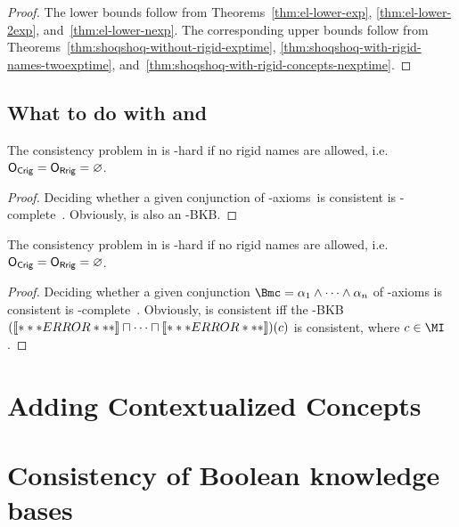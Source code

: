 \begin{proof}
  The lower bounds follow from Theorems~\ref{thm:el-lower-exp}, \ref{thm:el-lower-2exp},
  and~\ref{thm:el-lower-nexp}.  The corresponding upper bounds follow from
  Theorems~\ref{thm:shoqshoq-without-rigid-exptime}, \ref{thm:shoqshoq-with-rigid-names-twoexptime},
  and~\ref{thm:shoqshoq-with-rigid-concepts-nexptime}.
\end{proof}

\subsection{What to do with \texorpdfstring{\SHOIQEL}{SHOIQ[EL]} and \texorpdfstring{\ELSHOIQ}{EL[SHOIQ]}}
\label{sec:shoiq-el-and-el-shoiq}

\begin{theorem}\label{thm:shoiqel-lower-no-rigid}
  The consistency problem in \SHOIQEL is \NExpTime-hard if no rigid names are allowed, i.e.\ $\OCR = \ORR = \emptyset$.
\end{theorem}

\begin{proof}
    Deciding whether a given conjunction of \ALCOIQ-axioms~\B is consistent is
    \NExpTime-complete~\cite{Tob-JAIR00}.  Obviously, \B is also an \SHOIQEL-BKB.
\end{proof}

\begin{theorem}\label{thm:elshoiq-lower-no-rigid}
  The consistency problem in \ELSHOIQ is \NExpTime-hard if no rigid names are allowed, i.e.\ $\OCR = \ORR = \emptyset$.
\end{theorem}

\begin{proof}
  Deciding whether a given conjunction $\B = \alpha_{1} \land \dots \land \alpha_{n}$ of \ALCOIQ-axioms
  is consistent is \NExpTime-complete~\cite{Tob-JAIR00}.  Obviously, \B is consistent iff the \ELSHOIQ-BKB
  $(\oax{\alpha_{1}} \sqcap \dots \sqcap \oax{\alpha_{n}})(c)$ is consistent, where $c\in\MI$.
\end{proof}


\section{Adding Contextualized Concepts}
\label{sec:adding-cont-concepts}




\section{Consistency of Boolean \texorpdfstring{\SHOIQ}{SHOIQ} knowledge bases}
\label{sec:consistency-shoiq-bkb}

